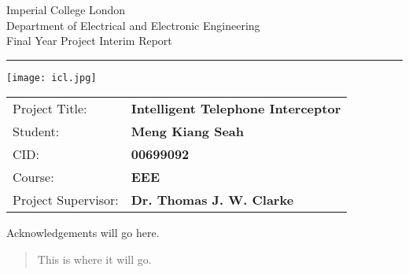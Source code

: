 \documentclass[12pt,a4paper]{report}
\begin{document}
\begin{titlepage}
                \setlength{\parindent}{0pt}
                \setlength{\parskip}{0pt}

                {
                                \Large
                                \raggedright
                                Imperial College London\\[17pt]
                                Department of Electrical and Electronic Engineering\\[17pt]
                                Final Year Project Interim Report\\[17pt]

                }

                \rule{\columnwidth}{3pt}
                \vfill
                \centering
                  \texttt{[image: icl.jpg]}
                \vfill
                \setlength{\tabcolsep}{0pt}

                \begin{tabular}{p{40mm}p{\dimexpr\columnwidth-40mm}}
                                Project Title: & \textbf{Intelligent Telephone Interceptor} \\[12pt]
                                Student: & \textbf{Meng Kiang Seah} \\[12pt]
                                CID: & \textbf{00699092} \\[12pt]
                                Course: & \textbf{EEE} \\[12pt]
                                Project Supervisor: & \textbf{Dr. Thomas J. W. Clarke} \\[12pt]
                \end{tabular}
\end{titlepage}


\begin{acknowledgments}
  Acknowledgements will go here.
\end{acknowledgments}

\begin{abstract}
   This is where it will go.
\end{abstract}

\tableofcontents
\newpage
\end{document}
